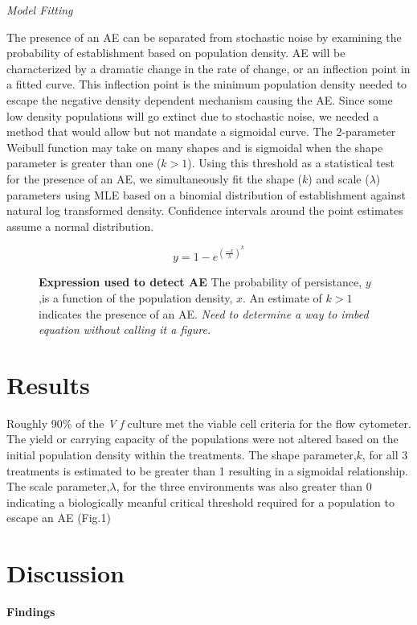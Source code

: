 \documentclass[a4paper,10pt]{article}
\begin{document}
\textit{Model Fitting}

The presence of an AE can be separated from stochastic noise by examining the probability of establishment based on population density. AE will be characterized by a dramatic change in the rate of change, or an inflection point in a fitted curve. This inflection point is the minimum population density needed to escape the negative density dependent mechanism causing the AE. Since some low density populations will go extinct due to stochastic noise, we needed a method that would allow but not mandate a sigmoidal curve. The 2-parameter Weibull function may take on many shapes and is sigmoidal when the shape parameter is greater than one ($k>1$). Using this threshold as a statistical test for the presence of an AE, we simultaneously fit the shape ($k$) and scale ($\lambda$) parameters using MLE based on a binomial distribution of establishment against natural log transformed density. Confidence intervals around the point estimates assume a normal distribution. 

\begin{figure}
\[ y = 1-e^{(\frac{-x}{\lambda})^{k}} \]
\caption{\textbf{Expression used to detect AE} The probability of persistance, $y$,is a function of the population density, $x$. An estimate of $k>1$ indicates the presence of an AE. \textit{Need to determine a way to imbed equation without calling it a figure.}}
\end{figure}

\section{Results}

Roughly 90\% of the \textit{V f} culture met the viable cell criteria for the flow cytometer. The yield or carrying capacity of the populations were not altered based on the initial population density within the treatments. The shape parameter,$k$, for all 3 treatments is estimated to be greater than 1 resulting in a sigmoidal relationship. The scale parameter,$\lambda$, for the three environments was also greater than 0 indicating a biologically meanful critical threshold required for a population to escape an AE (Fig.1) 
   
\section{Discussion}

\textbf{Findings}
\end{document}

